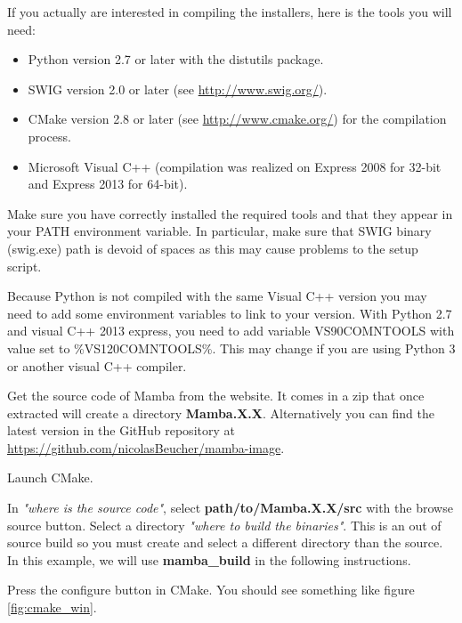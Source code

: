 \documentclass[a4paper,10pt,oneside]{article}
\begin{document}
If you actually are interested in compiling the installers, here is the tools
you will need:

\begin{itemize}
\item Python version 2.7 or later with the distutils package.
\item SWIG version 2.0 or later (see \url{http://www.swig.org/}).
\item CMake version 2.8 or later (see \url{http://www.cmake.org/}) for the 
compilation process.
\item Microsoft Visual C++ (compilation was realized on Express 2008 for 32-bit
and Express 2013 for 64-bit).
\end{itemize}


Make sure you have correctly installed the required tools and that they appear
in your PATH environment variable. In particular, make sure that SWIG binary
(swig.exe) path is devoid of spaces as this may cause problems to the setup
script.

Because Python is not compiled with the same Visual C++ version you may need
to add some environment variables to link to your version. With Python 2.7
and visual C++ 2013 express, you need to add variable VS90COMNTOOLS with
value set to \%VS120COMNTOOLS\%. This may change if you are using Python 3 or
another visual C++ compiler.

Get the source code of Mamba from the website. It comes in a zip that once
extracted will create a directory \textbf{Mamba.X.X}. Alternatively you can
find the latest version in the GitHub repository at 
\url{https://github.com/nicolasBeucher/mamba-image}.

Launch CMake.

In \textit{"where is the source code"}, select \textbf{path/to/Mamba.X.X/src} with
the browse source button. Select a directory \textit{"where to build the binaries"}.
This is an out of source build so you must create and select a different
directory than the source. In this example, we will use
\textbf{mamba\_build} in the following instructions.

Press the configure button in CMake. You should see something like
figure \ref{fig:cmake_win}.
\end{document}
